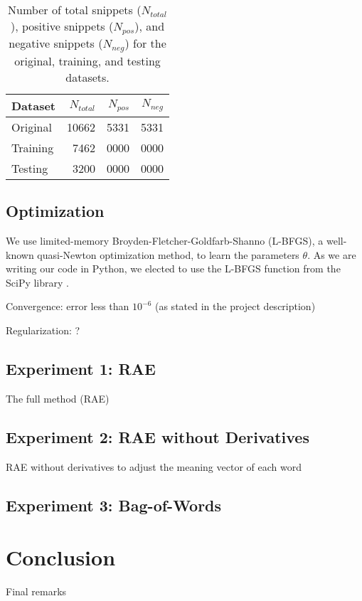 \documentclass{article}
\newcommand{\ra}[1]{\renewcommand{\arraystretch}{#1}}
\begin{document}
\begin{table}[t]
    \centering

    \caption{Number of total snippets ($N_{total}$), positive snippets ($N_{pos}$), and negative snippets ($N_{neg}$) for the original, training, and testing datasets.} 
    \label{tab:datasets}

    \ra{1.2}
    \begin{tabular}{@{} l r r r  @{}}
        \\
        \toprule
        \bf{Dataset} & $N_{total}$ & $N_{pos}$ & $N_{neg}$ \\
        \midrule
        Original & 10662 & 5331 & 5331 \\
        Training &  7462 & 0000 & 0000 \\
        Testing  &  3200 & 0000 & 0000 \\
        \bottomrule
    \end{tabular}
\end{table}


%
%
\subsection{Optimization}
We use limited-memory Broyden-Fletcher-Goldfarb-Shanno (L-BFGS), a well-known quasi-Newton optimization method, to learn the parameters $\theta$. As we are writing our code in Python, we elected to use the L-BFGS function from the SciPy library \cite{scipy}.

Convergence: error less than $10^{-6}$ (as stated in the project description)

Regularization: ?


%
%
\subsection{Experiment 1: RAE}
The full method (RAE)


%
%
\subsection{Experiment 2: RAE without Derivatives}
RAE without derivatives to adjust the meaning vector of each word


%
%
\subsection{Experiment 3: Bag-of-Words}



\section{Conclusion}
Final remarks




\small{


}
\end{document}
